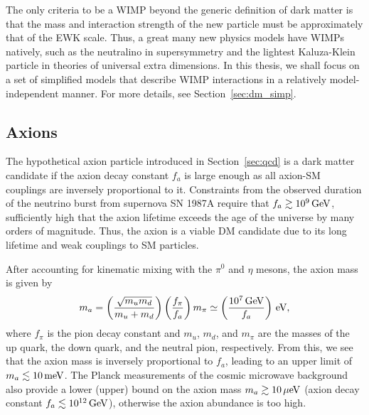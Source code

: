 The only criteria to be a WIMP beyond the generic definition of dark matter is that the mass and interaction strength of the new particle must be approximately that of the EWK scale.
Thus, a great many new physics models have WIMPs natively, such as the neutralino in supersymmetry and the lightest Kaluza-Klein particle in theories of universal extra dimensions.
In this thesis, we shall focus on a set of simplified models that describe WIMP interactions in a relatively model-independent manner.
For more details, see Section~\ref{sec:dm_simp}.

\subsection{Axions}
\label{sec:dm_axion}

The hypothetical axion particle introduced in Section~\ref{sec:qcd} is a dark matter candidate if the axion decay constant $f_a$ is large enough as all axion-SM couplings are inversely proportional to it.
Constraints from the observed duration of the neutrino burst from supernova SN 1987A require that $f_a \gtrsim 10^9\,\text{Ge\hspace{-.08em}V}$, sufficiently high that the axion lifetime exceeds the age of the universe by many orders of magnitude. %
Thus, the axion is a viable DM candidate due to its long lifetime and weak couplings to SM particles.

After accounting for kinematic mixing with the $\pi^0$ and $\eta$ mesons, the axion mass is given by
\begin{equation}
  m_a = \left(\frac{\sqrt{m_u m_d}}{m_u + m_d}\right) \left(\frac{f_\pi}{f_a}\right) m_\pi \simeq \left( \frac{10^7\,\text{Ge\hspace{-.08em}V}}{f_a}\right) \,\text{e\hspace{-.08em}V},
\end{equation}
where $f_\pi$ is the pion decay constant and $m_u$, $m_d$, and $m_\pi$ are the masses of the up quark, the down quark, and the neutral pion, respectively.
From this, we see that the axion mass is inversely proportional to $f_a$, leading to an upper limit of $m_a \lesssim 10 \,\text{me\hspace{-.08em}V}$.
The Planck measurements of the cosmic microwave background also provide a lower (upper) bound on the axion mass $m_a \gtrsim 10 \,\text{\ensuremath{\mu}e\hspace{-.08em}V}$ (axion decay constant $f_a \lesssim 10^{12}\,\text{Ge\hspace{-.08em}V}$), otherwise the axion abundance is too high.

